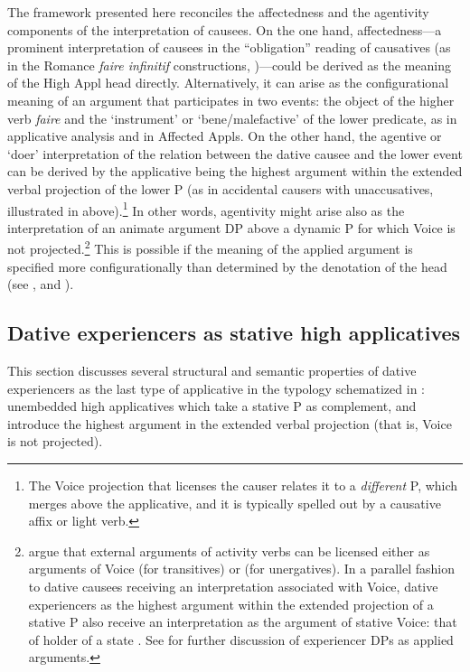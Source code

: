 \documentclass[output=paper,colorlinks,citecolor=brown,nonflat]{./langscibook}
\begin{document}
The framework presented here reconciles the affectedness and the agentivity components of the interpretation of causees. On the one hand, affectedness—a prominent interpretation of causees in the “obligation” reading of causatives (as in the Romance \textit{faire infinitif} constructions, \citealt{FolliHarley2007})—could be derived as the meaning of the High Appl head directly. Alternatively, it can arise as the configurational meaning of an argument that participates in two events: the object of the higher verb \textit{faire} and the ‘instrument’ or ‘bene/malefactive’ of the lower predicate, as in  applicative analysis and in Affected Appls. On the other hand, the agentive or ‘doer’ interpretation of the relation between the dative causee and the lower event can be derived by the applicative being the highest argument within the extended verbal projection of the lower \liv P (as in accidental causers with unaccusatives, illustrated in  above).\footnote{The Voice projection that licenses the causer relates it to a \textit{different} \liv P, which merges above the applicative, and it is typically spelled out by a causative affix or light verb.} In other words, agentivity might arise also as the interpretation of an animate argument DP above a dynamic \liv P for which Voice is not projected.\footnote{\citet{TollanOxford2018} argue that external arguments of activity verbs can be licensed either as arguments of Voice (for transitives) or \liv (for unergatives). In a parallel fashion to dative causees receiving an interpretation associated with Voice, dative experiencers as the highest argument within the extended projection of a stative \liv P also receive an interpretation as the argument of stative Voice: that of holder of a state \citep{Kratzer1996}. See  for further discussion of experiencer DPs as applied arguments.} This is possible if the meaning of the applied argument is specified more configurationally than determined by the denotation of the head (see \citealt{Cuervo2015Chapter}, and \citealt{WoodMarantz2017}).

\subsection{Dative experiencers as stative high applicatives}\label{sec:cuervo:4.4}

This section discusses several structural and semantic properties of dative experiencers as the last type of applicative in the typology schematized in : unembedded high applicatives which take a stative \liv P as complement, and introduce the highest argument in the extended verbal projection (that is, Voice is not projected).
\end{document}
